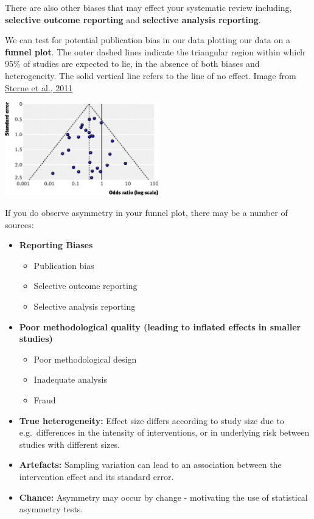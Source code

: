 \documentclass[
]{book}
\providecommand{\tightlist}{%
  \setlength{\itemsep}{0pt}\setlength{\parskip}{0pt}}
\begin{document}
There are also other biases that may effect your systematic review including, \textbf{selective outcome reporting} and \textbf{selective analysis reporting}.

We can test for potential publication bias in our data plotting our data on a \textbf{funnel plot}.
The outer dashed lines indicate the triangular region within which 95\% of studies are expected to lie, in the absence of both biases and heterogeneity. The solid vertical line refers to the line of no effect. Image from \href{https://www.bmj.com/content/343/bmj.d4002}{Sterne et al., 2011}

\includegraphics[width=0.5\textwidth,height=\textheight]{figs/funnelplot.jpg}

If you do observe asymmetry in your funnel plot, there may be a number of sources:

\begin{itemize}
\item
  \textbf{Reporting Biases}

  \begin{itemize}
  \tightlist
  \item
    Publication bias
  \item
    Selective outcome reporting
  \item
    Selective analysis reporting
  \end{itemize}
\item
  \textbf{Poor methodological quality (leading to inflated effects in smaller studies)}

  \begin{itemize}
  \tightlist
  \item
    Poor methodological design
  \item
    Inadequate analysis
  \item
    Fraud
  \end{itemize}
\item
  \textbf{True heterogeneity:} Effect size differs according to study size due to e.g.~differences in the intensity of interventions, or in underlying risk between studies with different sizes.
\item
  \textbf{Artefacts:} Sampling variation can lead to an association between the intervention effect and its standard error.
\item
  \textbf{Chance:} Asymmetry may occur by change - motivating the use of statistical asymmetry tests.
\end{itemize}
\end{document}

